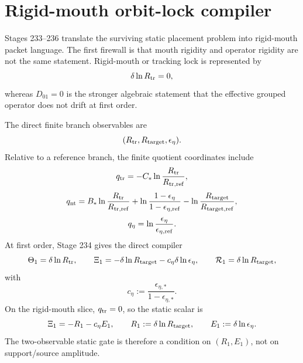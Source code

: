 
\section{Rigid-mouth orbit-lock compiler}
\label{sec:app-part07_same_charge_rigid_mouth:rigid-mouth-orbit-lock-compiler}

Stages 233--236 translate the surviving static placement problem into rigid-mouth packet language.  The first firewall is that mouth rigidity and operator rigidity are not the same statement.  Rigid-mouth or tracking lock is represented by
\begin{equation}
\label{eq:app-part07-tracking-lock}
\delta\ln R_{\rm tr}=0,
\end{equation}
whereas \(D_{01}=0\) is the stronger algebraic statement that the effective grouped operator does not drift at first order.

The direct finite branch observables are
\begin{equation}
\label{eq:app-part07-direct-observables}
(R_{\rm tr},R_{\rm target},\epsilon_\eta).
\end{equation}
Relative to a reference branch, the finite quotient coordinates include
\begin{equation}
\label{eq:app-part07-qtr-qnt-qeta-finite}
q_{\rm tr}=-C_*\ln\frac{R_{\rm tr}}{R_{\rm tr,ref}},
\end{equation}
\begin{equation}
\label{eq:app-part07-qnt-finite}
q_{\rm nt}=B_*\ln\frac{R_{\rm tr}}{R_{\rm tr,ref}}
+
\ln\frac{1-\epsilon_\eta}{1-\epsilon_{\eta,\rm ref}}
-
\ln\frac{R_{\rm target}}{R_{\rm target,ref}},
\end{equation}
\begin{equation}
\label{eq:app-part07-qeta-finite}
q_\eta=\ln\frac{\epsilon_\eta}{\epsilon_{\eta,\rm ref}}.
\end{equation}
At first order, Stage 234 gives the direct compiler
\begin{equation}
\label{eq:app-part07-direct-first-order}
\Theta_1=\delta\ln R_{\rm tr},
\qquad
\Xi_1=-\delta\ln R_{\rm target}-c_\eta\delta\ln\epsilon_\eta,
\qquad
\mathcal R_1=\delta\ln R_{\rm target},
\end{equation}
with
\begin{equation}
\label{eq:app-part07-ceta}
c_\eta:=\frac{\epsilon_{\eta,*}}{1-\epsilon_{\eta,*}}.
\end{equation}
On the rigid-mouth slice, \(q_{\rm tr}=0\), so the static scalar is
\begin{equation}
\label{eq:app-part07-rigid-static-scalar}
\Xi_1=-R_1-c_\eta E_1,
\qquad
R_1:=\delta\ln R_{\rm target},
\qquad
E_1:=\delta\ln\epsilon_\eta.
\end{equation}
The two-observable static gate is therefore a condition on \((R_1,E_1)\), not on support/source amplitude.

